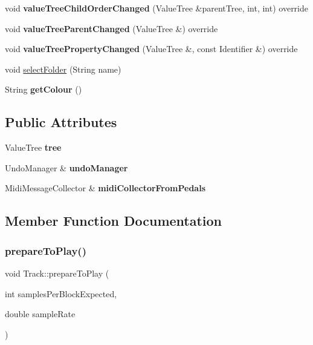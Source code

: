 \begin{DoxyCompactItemize}
void {\bfseries value\+Tree\+Child\+Order\+Changed} (Value\+Tree \&parent\+Tree, int, int) override
\item 
\mbox{\label{class_track_a078ecba375d2d7a0dd23f32dfe66fcee}} 
void {\bfseries value\+Tree\+Parent\+Changed} (Value\+Tree \&) override
\item 
\mbox{\label{class_track_ae1b012e1f47f2f9eebb7f9598e0b85dc}} 
void {\bfseries value\+Tree\+Property\+Changed} (Value\+Tree \&, const Identifier \&) override
\item 
void \mbox{\hyperlink{class_track_af1861edf6919ed15f3a370fe1069d1ec}{select\+Folder}} (String name)
\item 
\mbox{\label{class_track_a4c3852a7c322f6867697dca7c364fffb}} 
String {\bfseries get\+Colour} ()
\end{DoxyCompactItemize}
\subsection*{Public Attributes}
\begin{DoxyCompactItemize}
\item 
\mbox{\label{class_track_a73983cdf7f99af0f4b6fa743398653d2}} 
Value\+Tree {\bfseries tree}
\item 
\mbox{\label{class_track_a66900bc7b7c24d93c142fabba87a4406}} 
Undo\+Manager \& {\bfseries undo\+Manager}
\item 
\mbox{\label{class_track_a868ab78dd0f719644a996d98cd30e2a2}} 
Midi\+Message\+Collector \& {\bfseries midi\+Collector\+From\+Pedals}
\end{DoxyCompactItemize}


\subsection{Member Function Documentation}
\mbox{\label{class_track_a0c093e11c72e34eb8696c351ca020fb9}} 
\subsubsection{\texorpdfstring{prepareToPlay()}{prepareToPlay()}}
{\footnotesize\ttfamily void Track\+::prepare\+To\+Play (\begin{DoxyParamCaption}\item[{int}]{samples\+Per\+Block\+Expected,  }\item[{double}]{sample\+Rate }\end{DoxyParamCaption})\hspace{0.3cm}{\ttfamily [override]}}

